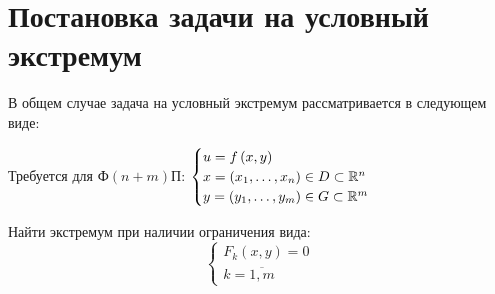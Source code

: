 \documentclass[../../main.tex]{subfiles}
\begin{document}
\section{Постановка задачи на условный экстремум}

В общем случае задача на условный экстремум рассматривается в 
следующем виде:

Требуется для Ф$(n+m)$П:
$\begin{cases}
	u = f\left( x, y \right) \\
	x = \left( x_1, \ldots, x_n \right) \in D \subset \mathbb{R}^n \\
	y = \left( y_1, \ldots, y_m \right) \in G \subset \mathbb{R}^m
\end{cases}$

Найти экстремум при наличии ограничения вида:
\begin{equation}
\begin{cases} \label{lec_10.num_1}
F_k(x, y) = 0 \\
k = \overline{1, m}
\end{cases} 
\end{equation}
\end{document}
